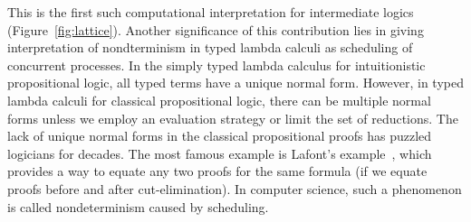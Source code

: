 This is the first such computational
interpretation for intermediate logics (Figure~\ref{fig:lattice}).
Another significance of this contribution
lies in giving interpretation of nondterminism in typed
lambda calculi as scheduling of concurrent processes.
In the simply typed lambda calculus for intuitionistic
propositional logic, all typed terms have a unique normal form.
However, in typed lambda calculi for classical propositional logic,
there can be multiple normal forms unless we employ an evaluation
strategy or limit the set of reductions.
The lack of unique normal forms in the classical propositional proofs
has puzzled logicians for decades.
The most famous example is Lafont's
example~\citep[B.1.]{girard1989proofs}, which provides a way to equate
any two proofs for the same formula (if we equate proofs before and
after cut-elimination).
In computer science, such a phenomenon is called nondeterminism caused by scheduling.

